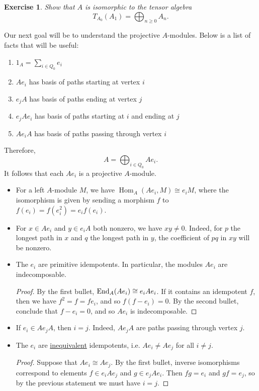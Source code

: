 \documentclass{book}
\newtheorem {exercise}[theorem] {Exercise}
\DeclareMathOperator{\Hom}{Hom}
\begin{document}
\begin{exercise}
Show that $A$ is isomorphic to the tensor algebra
$$
T_{A_0}(A_1)=\bigoplus_{n\geq 0} A_n.
$$
\end{exercise}

Our next goal will be to understand the projective $A$-modules. Below is a list of facts that will be useful:

\begin{enumerate}
\item $1_A=\sum_{i\in Q_0} e_i$

\item $Ae_i$ has basis of paths starting at vertex $i$

\item $e_jA$ has basis of paths ending at vertex $j$

\item $e_jAe_i$ has basis of paths starting at $i$ and ending at $j$

\item $Ae_iA$ has basis of paths passing through vertex $i$
\end{enumerate}

Therefore,
$$
A=\bigoplus_{i\in Q_0} Ae_i.
$$
It follows that each $Ae_i$ is a projective $A$-module. 
\begin{itemize}
\item For a left $A$-module $M$, we have $\Hom_A(Ae_i,M)\cong e_iM$, where the isomorphism is given by sending a morphism $f$ to $f(e_i)=f(e_i^2)=e_if(e_i)$.

\item For $x\in Ae_i$ and $y\in e_iA$ both nonzero, we have $xy\neq 0$. Indeed, for $p$ the longest path in $x$ and $q$ the longest path in $y$, the coefficient of $pq$ in $xy$ will be nonzero.

\item The $e_i$ are primitive idempotents. In particular, the modules $Ae_i$ are indecomposable. 

\begin{proof}
By the first bullet, $\textnormal{End}_A(Ae_i)\cong e_iAe_i$. If it contains an idempotent $f$, then we have $f^2=f=fe_i$, and so $f(f-e_i)=0$. By the second bullet, conclude that $f-e_i=0$, and so $Ae_i$ is indecomposable.
\end{proof}

\item If $e_i\in Ae_jA$, then $i=j$. Indeed, $Ae_jA$ are paths passing through vertex $j$.

\item The $e_i$ are \underline{inequivalent} idempotents, i.e. $Ae_i\neq Ae_j$ for all $i\neq j$. 

\begin{proof}
Suppose that $Ae_i\cong Ae_j$. By the first bullet, inverse isomorphisms correspond to elements $f\in e_iAe_j$ and $g\in e_jAe_i$. Then $fg=e_i$ and $gf=e_j$, so by the previous statement we must have $i=j$.
\end{proof}

\end{itemize}
\end{document}

